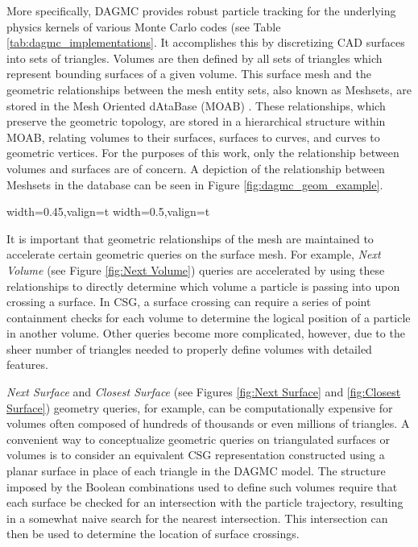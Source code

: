More specifically, DAGMC provides robust particle tracking for the underlying
physics kernels of various Monte Carlo codes (see Table
\ref{tab:dagmc_implementations}. It accomplishes this by discretizing CAD
surfaces into sets of triangles. Volumes are then defined by all sets of
triangles which represent bounding surfaces of a given volume. This surface mesh
and the geometric relationships between the mesh entity sets, also known as
Meshsets, are stored in the Mesh Oriented dAtaBase (MOAB)
\cite{Tautges_2004}. These relationships, which preserve the geometric topology,
are stored in a hierarchical structure within MOAB, relating volumes to their
surfaces, surfaces to curves, and curves to geometric vertices. For the purposes
of this work, only the relationship between volumes and surfaces are of
concern. A depiction of the relationship between Meshsets in the
database can be seen in Figure \ref{fig:dagmc_geom_example}.

\begin{sidewaysfigure}
  \centering
  {width=0.45\textwidth,valign=t}
  {width=0.5\textwidth,valign=t}
  \caption[The DAGMC data model in MOAB.]{Left: Partial representation of a discretized DAGMC geometry. Right:
    A representation of the mesh-based hierarchy used to maintain topological
    information about the CAD geometry in MOAB.}
  \label{fig:dagmc_geom_example}
\end{sidewaysfigure}

It is important that geometric relationships of the mesh are maintained to
accelerate certain geometric queries on the surface mesh. For example,
\textit{Next Volume} (see Figure \ref{fig:Next Volume}) queries are accelerated
by using these relationships to directly determine which volume a particle is
passing into upon crossing a surface. In CSG, a surface crossing can require a
series of point containment checks for each volume to determine the logical
position of a particle in another volume. Other queries become more complicated,
however, due to the sheer number of triangles needed to properly define volumes
with detailed features.

\textit{Next Surface} and \textit{Closest Surface} (see Figures \ref{fig:Next
  Surface} and \ref{fig:Closest Surface}) geometry queries, for example, can be
computationally expensive for volumes often composed of hundreds of thousands or
even millions of triangles. A convenient way to conceptualize geometric queries
on triangulated surfaces or volumes is to consider an equivalent CSG
representation constructed using a planar surface in place of each triangle in
the DAGMC model. The structure imposed by the Boolean combinations used to
define such volumes require that each surface be checked for an intersection
with the particle trajectory, resulting in a somewhat naive search for the
nearest intersection. This intersection can then be used to
determine the location of surface crossings.

